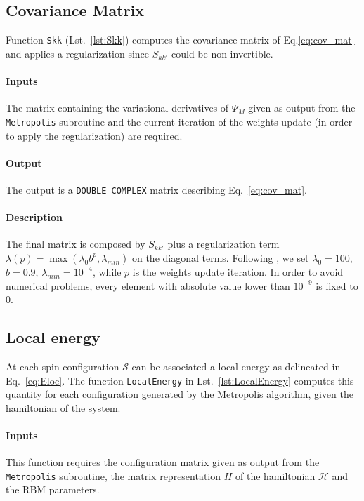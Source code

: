 \documentclass[a4paper,11pt]{article}
\begin{document}
\subsection{Covariance Matrix}

Function \texttt{Skk} (Lst.~\ref{lst:Skk}) computes the covariance matrix of Eq.\ref{eq:cov_mat} and applies a regularization since $S_{kk'}$ could be non invertible.

\paragraph{Inputs}
The matrix containing the variational derivatives of $\Psi_M$ given as output from the \texttt{Metropolis} subroutine and the current iteration of the weights update (in order to apply the regularization) are required.

\paragraph{Output}
The output is a \texttt{DOUBLE COMPLEX} matrix describing Eq.~\ref{eq:cov_mat}.

\paragraph{Description}
The final matrix is composed by $S_{kk'}$ plus a regularization term $\lambda(p) = \max(\lambda_0 b^p, \lambda_{min})$ on the diagonal terms. Following \cite{Carleo_2017}, we set $\lambda_0 = 100$, $b=0.9$, $\lambda_{min} = 10^{-4}$, while $p$ is the weights update iteration. In order to avoid numerical problems, every element with absolute value lower than $10^{-9}$ is fixed to 0.


\subsection{Local energy}
\label{sec:LocalEnergy}

At each spin configuration $\mathcal{S}$ can be associated a local energy as delineated in Eq.~\ref{eq:Eloc}. The function \texttt{LocalEnergy} in Lst.~\ref{lst:LocalEnergy} computes this quantity for each configuration generated by the Metropolis algorithm, given the hamiltonian of the system.

\paragraph{Inputs}
This function requires the configuration matrix given as output from the \texttt{Metropolis} subroutine, the matrix representation $H$ of the hamiltonian $\mathcal{H}$ and the RBM parameters.
\end{document}
